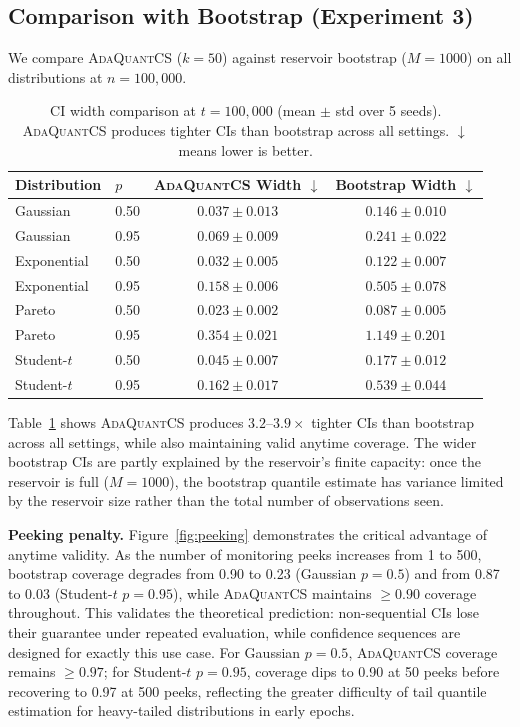 \documentclass{article}
\newcommand{\ours}{\textsc{AdaQuantCS}}
\begin{document}
\subsection{Comparison with Bootstrap (Experiment 3)}

We compare \ours{} ($k = 50$) against reservoir bootstrap ($M = 1000$) on all distributions at $n = 100{,}000$.

\begin{table}[t]
\caption{CI width comparison at $t = 100{,}000$ (mean $\pm$ std over 5 seeds). \ours{} produces tighter CIs than bootstrap across all settings. $\downarrow$ means lower is better.}
\label{tab:comparison}
\centering
\begin{tabular}{llcc}
\toprule
Distribution & $p$ & \ours{} Width $\downarrow$ & Bootstrap Width $\downarrow$ \\
\midrule
Gaussian     & 0.50 & $\mathbf{0.037 \pm 0.013}$ & $0.146 \pm 0.010$ \\
Gaussian     & 0.95 & $\mathbf{0.069 \pm 0.009}$ & $0.241 \pm 0.022$ \\
Exponential  & 0.50 & $\mathbf{0.032 \pm 0.005}$ & $0.122 \pm 0.007$ \\
Exponential  & 0.95 & $\mathbf{0.158 \pm 0.006}$ & $0.505 \pm 0.078$ \\
Pareto       & 0.50 & $\mathbf{0.023 \pm 0.002}$ & $0.087 \pm 0.005$ \\
Pareto       & 0.95 & $\mathbf{0.354 \pm 0.021}$ & $1.149 \pm 0.201$ \\
Student-$t$  & 0.50 & $\mathbf{0.045 \pm 0.007}$ & $0.177 \pm 0.012$ \\
Student-$t$  & 0.95 & $\mathbf{0.162 \pm 0.017}$ & $0.539 \pm 0.044$ \\
\bottomrule
\end{tabular}
\end{table}

Table~\ref{tab:comparison} shows \ours{} produces $3.2$--$3.9\times$ tighter CIs than bootstrap across all settings, while also maintaining valid anytime coverage. The wider bootstrap CIs are partly explained by the reservoir's finite capacity: once the reservoir is full ($M = 1000$), the bootstrap quantile estimate has variance limited by the reservoir size rather than the total number of observations seen.

\textbf{Peeking penalty.} Figure~\ref{fig:peeking} demonstrates the critical advantage of anytime validity. As the number of monitoring peeks increases from 1 to 500, bootstrap coverage degrades from 0.90 to 0.23 (Gaussian $p = 0.5$) and from 0.87 to 0.03 (Student-$t$ $p = 0.95$), while \ours{} maintains $\geq 0.90$ coverage throughout. This validates the theoretical prediction: non-sequential CIs lose their guarantee under repeated evaluation, while confidence sequences are designed for exactly this use case. For Gaussian $p = 0.5$, \ours{} coverage remains $\geq 0.97$; for Student-$t$ $p = 0.95$, coverage dips to 0.90 at 50 peeks before recovering to 0.97 at 500 peeks, reflecting the greater difficulty of tail quantile estimation for heavy-tailed distributions in early epochs.
\end{document}
